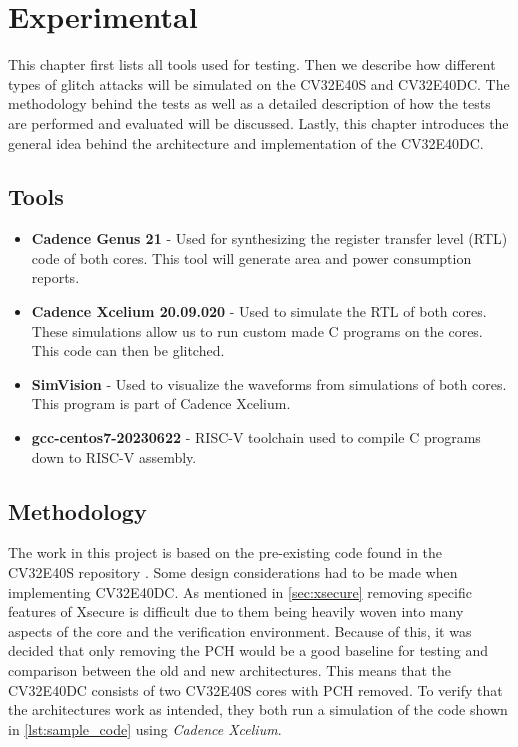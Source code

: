 \chapter{Experimental}
\label{chap4}

This chapter first lists all tools used for testing. Then we describe how different types of glitch attacks will be simulated on the CV32E40S and CV32E40DC. The methodology behind the tests as well as a detailed description of how the tests are performed and evaluated will be discussed. Lastly, this chapter introduces the general idea behind the architecture and implementation of the CV32E40DC. 

\section{Tools}
\label{sec:tools}

\begin{itemize}
    \item \textbf{Cadence Genus 21}\cite{cadence} - Used for synthesizing the register transfer level (RTL) code of both cores. This tool will generate area and power consumption reports. 
    \item \textbf{Cadence Xcelium 20.09.020}\cite{xcelium} - Used to simulate the RTL of both cores. These simulations allow us to run custom made C programs on the cores. This code can then be glitched.
    \item \textbf{SimVision} \cite{simvision} - Used to visualize the waveforms from simulations of both cores. This program is part of Cadence Xcelium.
    \item \textbf{gcc-centos7-20230622}\cite{toolchain} - RISC-V toolchain used to compile C programs down to RISC-V assembly. 
\end{itemize}

\section{Methodology}
\label{sec:method}

The work in this project is based on the pre-existing code found in the CV32E40S repository \cite{cv32e40s_github}. Some design considerations had to be made when implementing CV32E40DC. As mentioned in \autoref{sec:xsecure} removing specific features of Xsecure is difficult due to them being heavily woven into many aspects of the core and the verification environment. Because of this, it was decided that only removing the PCH would be a good baseline for testing and comparison between the old and new architectures. This means that the CV32E40DC consists of two CV32E40S cores with PCH removed. To verify that the architectures work as intended, they both run a simulation of the code shown in \autoref{lst:sample_code} using \textit{Cadence Xcelium}. 

